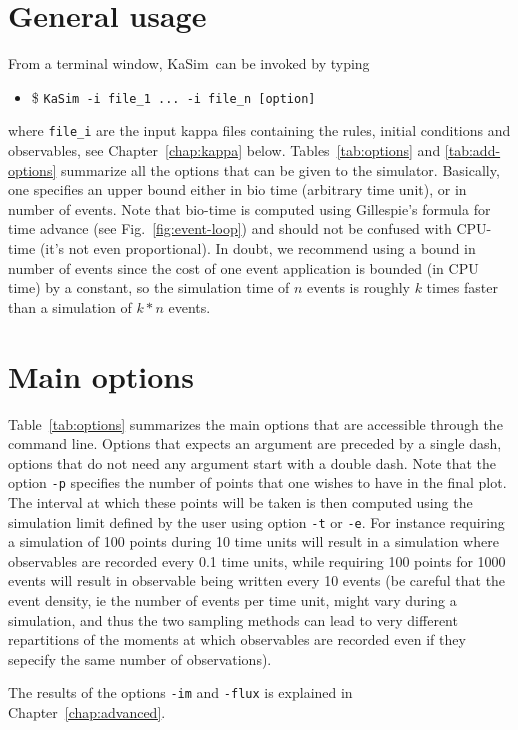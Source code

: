 \documentclass[11pt]{book}
\def\KaSim{\textsf{KaSim}}
\def\ttt#1{\texttt{#1}}
\def\ie{ie }
\def\ITE#1{\begin{itemize}#1\end{itemize}}
\begin{document}
\section{General usage}
From a terminal window, \KaSim~can be invoked by typing 
\ITE{
\item[\$] \ttt{KaSim -i file\_1 ... -i file\_n [option] }
}
where \ttt{file\_i} are the input kappa files containing the rules, initial conditions and observables, see Chapter~\ref{chap:kappa} below. Tables~\ref{tab:options} and \ref{tab:add-options} summarize all the options that can be given to the simulator. Basically, one specifies an upper bound either in bio time (arbitrary time unit), or in number of events. Note that bio-time is computed using Gillespie's formula for time advance (see Fig.~\ref{fig:event-loop}) and should not be confused with CPU-time (it's not even proportional). In doubt, we recommend using a bound in number of events since the cost of one event application is bounded (in CPU time) by a constant, so the simulation time of $n$ events is roughly $k$ times faster than a simulation of $k*n$ events.

\section{Main options}

Table~\ref{tab:options} summarizes the main options that are accessible through the command line. Options that expects an argument are preceded by a single dash, options that do not need any argument start with a double dash. Note that the option \ttt{-p} specifies the number of points that one wishes to have in the final plot. The interval at which these points will be taken is then computed using the simulation limit defined by the user using option \ttt{-t} or \ttt{-e}. For instance requiring a simulation of 100 points during 10 time units will result in a simulation where observables are recorded every 0.1 time units, while requiring 100 points for 1000 events will result in observable being written every 10 events (be careful that the event density, \ie the number of events per time unit, might vary during a simulation, and thus the two sampling methods can lead to very different repartitions of the moments at which observables are recorded even if they sepecify the same number of observations). 

The results of the options \ttt{-im} and \ttt{-flux} is explained in Chapter~\ref{chap:advanced}. 
\end{document}
